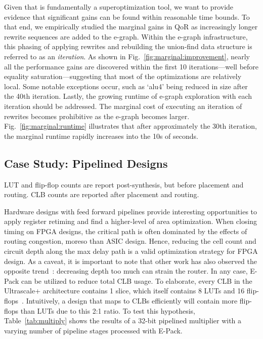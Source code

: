 Given that \shortname{} is fundamentally a superoptimization tool, we want to
provide evidence that significant gains can be found within reasonable time
bounds. To that end, we empirically studied the marginal gains in QoR as
increasingly longer rewrite sequences are added to the e-graph. Within the
e-graph infrastructure, this phasing of applying rewrites and rebuilding the
union-find data structure is referred to as an \textit{iteration}. As shown in
Fig.~\ref{fig:marginal:improvement}, nearly all the performance gains are
discovered within the first 10 iterations---well before equality
saturation---suggesting that most of the optimizations are relatively local.
Some notable exceptions occur, such as `alu4' being reduced in size after the
40th iteration. Lastly, the growing runtime of e-graph exploration with each
iteration should be addressed. The marginal cost of executing an iteration of
rewrites becomes prohibitive as the e-graph becomes larger.
Fig.~\ref{fig:marginal:runtime} illustrates that after approximately the 30th
iteration, the marginal runtime rapidly increases into the 10s of seconds.

\subsection{Case Study: Pipelined Designs}\label{sec:results:retiming}
\begin{table}[t]
    \centering
    \caption{LUT and flip-flop counts are report post-synthesis, but before placement and routing. CLB counts are reported after placement and routing.}\label{tab:multiply}
\end{table}

Hardware designs with feed forward pipelines provide interesting opportunities
to apply register retiming and find a higher-level of area optimization. When
closing timing on FPGA designs, the critical path is often dominated by the
effects of routing congestion, moreso than ASIC design. Hence, reducing the
cell count and circuit depth along the max delay path is a valid optimization
strategy for FPGA design. As a caveat, it is important to note that other work
has also observed the opposite trend~\cite{academicfpga}: decreasing depth too
much can strain the router. In any case, E-Pack can be utilized to reduce total
CLB usage. To elaborate, every CLB in the Ultrascale+ architecture contains 1
slice, which itself contains 8 LUTs and 16 flip-flops~\cite{ug574}.
Intuitively, a design that maps to CLBs efficiently will contain more
flip-flops than LUTs due to this 2:1 ratio. To test this hypothesis,
Table~\ref{tab:multiply} shows the results of a 32-bit pipelined multiplier
with a varying number of pipeline stages processed with E-Pack.

